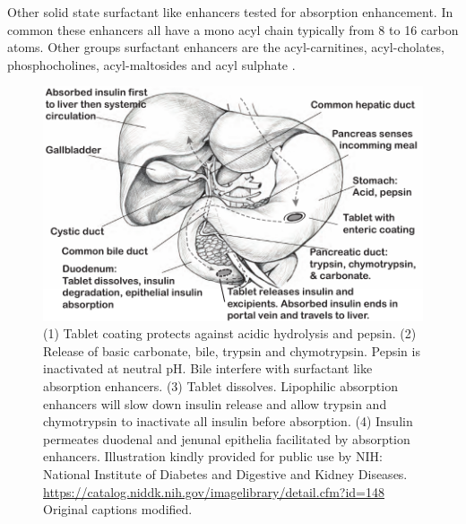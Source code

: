 Other solid state surfactant like enhancers tested for absorption enhancement. In common these enhancers all have a mono acyl chain typically from 8 to 16 carbon atoms. Other groups surfactant enhancers are the acyl-carnitines, acyl-cholates\cite{lee2000oral}, phosphocholines\cite{liu1999dodecylphosphocholine}, acyl-maltosides \cite{petersen2013colonic} and acyl sulphate \cite{anderberg1993epithelial}.

\begin{figure}[ht]

\includegraphics[width=\textwidth,height=\textheight,keepaspectratio]{graphics/intro_anatomy2.pdf}
\caption{(1) Tablet coating protects against acidic hydrolysis and pepsin. (2) Release of basic carbonate, bile, trypsin and chymotrypsin. Pepsin is inactivated at neutral pH. Bile interfere with surfactant like absorption enhancers. (3) Tablet dissolves. Lipophilic absorption enhancers will slow down insulin release and allow trypsin and chymotrypsin to inactivate all insulin before absorption. (4) Insulin permeates duodenal and jenunal epithelia facilitated by absorption enhancers. Illustration kindly provided for public use by NIH: National Institute of Diabetes and Digestive and Kidney Diseases. \url{https://catalog.niddk.nih.gov/imagelibrary/detail.cfm?id=148} Original captions modified.}
\label{intro_glucoseTolerance}
\end{figure}

